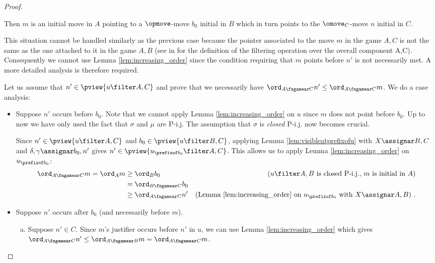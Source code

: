 \begin{proof}
\begin{enumerate}[1)]
        Then $m$ is an initial move in $A$
        pointing to a $\opmove$-move
        $b_0$ initial in $B$ which in turn points to the $\omove_C$-move $n$ initial in $C$.

        This situation cannot be handled similarly as the previous case because the pointer associated to the move $m$ in the game $A,C$ is not the same as the one attached to it in the game $A,B$ (see in \cite{Abr02} for the definition of the  filtering operation over the overall component A,C). Consequently we cannot use Lemma \ref{lem:increasing_order} since the
        condition requiring that $m$ points before $n'$ is not necessarily met. A more detailed analysis is therefore required.

        Let us assume that $n'\in \pview{u\filter A,C}$ and
        prove that we necessarily have $\ord_{A\fngamear C} n' \leq \ord_{A\fngamear C} m$. We do a case analysis:
        \begin{itemize}[-]
        \item Suppose $n'$ occurs before $b_0$.
        Note that we cannot apply Lemma \ref{lem:increasing_order} on $u$
        since $m$ does not point before $b_0$.
        Up to now we have only used the fact that $\sigma$ and $\mu$ are P-i.j. The assumption that $\sigma$ is  \emph{closed} P-i.j. now becomes crucial.

        Since $n' \in \pview{u\filter A,C}$ and
        $b_0 \in \pview{u\filter B,C}$, applying Lemma \ref{lem:visibleatprefixofu}
        with $X\assignar B,C$ and $\delta,\gamma \assignar b_0,n'$ gives
        $n' \in \pview{u_{\prefixof b_0}\filter A,C}$. This allows us to apply Lemma \ref{lem:increasing_order} on $u_{\prefixof b_0}$:
            \begin{align*}
            \ord_{A\fngamear C} m
            = \ord_A m
            & \geq \ord_B b_0 & \mbox{($u \filter A,B$ is closed P-i.j., $m$ is initial in $A$)} \\
            & = \ord_{B\fngamear C} b_0  \\
            & \geq \ord_{A\fngamear C} n' & \mbox{(Lemma \ref{lem:increasing_order} on $u_{\prefixof b_0}$ with $X\assignar A,B$)} \ .
            \end{align*}

        \item Suppose $n'$ occurs after $b_0$ (and necessarily before $m$).

            \begin{enumerate}[a.]
            \item Suppose $n'\in C$. Since $m$'s justifier occurs before $n'$ in $u$, we can use Lemma \ref{lem:increasing_order} which gives $\ord_{A\fngamear C} n' \leq \ord_{A\fngamear B} m
                = \ord_{A\fngamear C} m$.


\end{enumerate}
\end{itemize}
\end{enumerate}
\end{proof}
